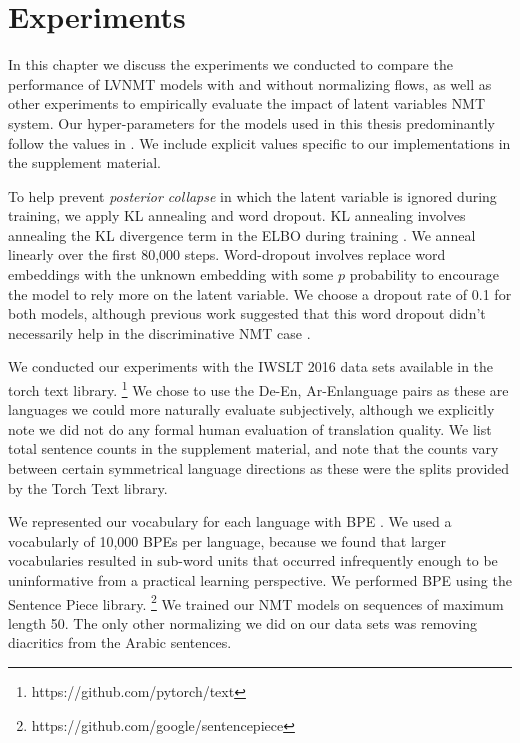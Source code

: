 \chapter{Experiments}

In this chapter we discuss the experiments we conducted to compare the performance of \ac{LVNMT} models with and without normalizing flows, as well as other experiments to empirically evaluate the impact of latent variables \ac{NMT} system.  Our hyper-parameters for the models used in this thesis predominantly follow the values in \cite{eikema2018AEVNMT}. We include explicit values specific to our implementations in the supplement material.

To help prevent \textit{posterior collapse} in which the latent variable is ignored during training, we apply KL annealing and word dropout. KL annealing involves annealing the KL divergence term in the \ac{ELBO} during training \cite{bowman2015GeneratingSent}. We anneal  linearly over the first 80,000 steps. Word-dropout involves replace word embeddings with the unknown embedding with some $p$ probability to encourage the model to rely more on the latent variable. We choose a dropout rate of 0.1 for both models, although previous work suggested that this word dropout didn't necessarily help in the discriminative \ac{NMT} case \cite{harshil2018GNMT}. 

We conducted our experiments with the IWSLT 2016 data sets available in the torch text library. \footnote{https://github.com/pytorch/text} We chose to use the De-En, Ar-Enlanguage pairs as these are languages we could more naturally evaluate subjectively, although we explicitly note we did not do any formal human evaluation of translation quality. We list total sentence counts in the supplement material, and note that the counts vary between certain symmetrical language directions as these were the splits provided by the Torch Text library. 

We represented our vocabulary for each language with \ac{BPE} \cite{sennrich2015NMTRarwordsBPE}. We used a vocabularly of 10,000 \ac{BPE}s per language, because we found that larger vocabularies resulted in sub-word units that occurred infrequently enough to be uninformative from a practical learning perspective. We performed \ac{BPE} using the Sentence Piece library. \footnote{https://github.com/google/sentencepiece} We trained our \ac{NMT} models on sequences of maximum length 50. The only other normalizing we did on our data sets was removing diacritics from the Arabic sentences. 


